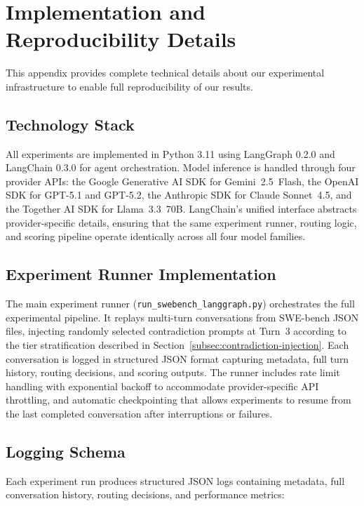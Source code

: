 \section{Implementation and Reproducibility Details}
\label{appendix:implementation}

This appendix provides complete technical details about our experimental infrastructure to enable full reproducibility of our results.

\subsection{Technology Stack}
\label{appendix:tech-stack}

All experiments are implemented in Python 3.11 using LangGraph 0.2.0 and LangChain 0.3.0 for agent orchestration. Model inference is handled through four provider APIs: the Google Generative AI SDK for Gemini~2.5~Flash, the OpenAI SDK for GPT-5.1 and GPT-5.2, the Anthropic SDK for Claude Sonnet~4.5, and the Together AI SDK for Llama~3.3~70B. LangChain's unified interface abstracts provider-specific details, ensuring that the same experiment runner, routing logic, and scoring pipeline operate identically across all four model families.

\subsection{Experiment Runner Implementation}
\label{appendix:experiment-runner}

The main experiment runner (\texttt{run\_swebench\_langgraph.py}) orchestrates the full experimental pipeline. It replays multi-turn conversations from SWE-bench JSON files, injecting randomly selected contradiction prompts at Turn~3 according to the tier stratification described in Section~\ref{subsec:contradiction-injection}. Each conversation is logged in structured JSON format capturing metadata, full turn history, routing decisions, and scoring outputs. The runner includes rate limit handling with exponential backoff to accommodate provider-specific API throttling, and automatic checkpointing that allows experiments to resume from the last completed conversation after interruptions or failures.

\subsection{Logging Schema}
\label{appendix:logging-schema}

Each experiment run produces structured JSON logs containing metadata, full conversation history, routing decisions, and performance metrics:

